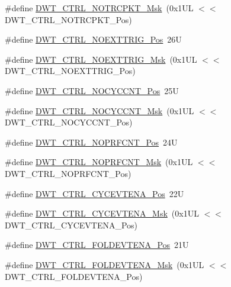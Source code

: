 \begin{DoxyCompactItemize}
\#define \hyperlink{group___c_m_s_i_s___d_w_t_ga04d8bb0a065ca38e2e5f13a97e1f7073}{D\+W\+T\+\_\+\+C\+T\+R\+L\+\_\+\+N\+O\+T\+R\+C\+P\+K\+T\+\_\+\+Msk}~(0x1\+U\+L $<$$<$ D\+W\+T\+\_\+\+C\+T\+R\+L\+\_\+\+N\+O\+T\+R\+C\+P\+K\+T\+\_\+\+Pos)
\item 
\#define \hyperlink{group___c_m_s_i_s___d_w_t_gad997b9026715d5609b5a3b144eca42d0}{D\+W\+T\+\_\+\+C\+T\+R\+L\+\_\+\+N\+O\+E\+X\+T\+T\+R\+I\+G\+\_\+\+Pos}~26U
\item 
\#define \hyperlink{group___c_m_s_i_s___d_w_t_gacc7d15edf7a27147c422099ab475953e}{D\+W\+T\+\_\+\+C\+T\+R\+L\+\_\+\+N\+O\+E\+X\+T\+T\+R\+I\+G\+\_\+\+Msk}~(0x1\+U\+L $<$$<$ D\+W\+T\+\_\+\+C\+T\+R\+L\+\_\+\+N\+O\+E\+X\+T\+T\+R\+I\+G\+\_\+\+Pos)
\item 
\#define \hyperlink{group___c_m_s_i_s___d_w_t_ga337f6167d960f57f12aa382ffecce522}{D\+W\+T\+\_\+\+C\+T\+R\+L\+\_\+\+N\+O\+C\+Y\+C\+C\+N\+T\+\_\+\+Pos}~25U
\item 
\#define \hyperlink{group___c_m_s_i_s___d_w_t_gaf40c8d7a4fd978034c137e90f714c143}{D\+W\+T\+\_\+\+C\+T\+R\+L\+\_\+\+N\+O\+C\+Y\+C\+C\+N\+T\+\_\+\+Msk}~(0x1\+U\+L $<$$<$ D\+W\+T\+\_\+\+C\+T\+R\+L\+\_\+\+N\+O\+C\+Y\+C\+C\+N\+T\+\_\+\+Pos)
\item 
\#define \hyperlink{group___c_m_s_i_s___d_w_t_gad52a0e5be84363ab166cc17beca0d048}{D\+W\+T\+\_\+\+C\+T\+R\+L\+\_\+\+N\+O\+P\+R\+F\+C\+N\+T\+\_\+\+Pos}~24U
\item 
\#define \hyperlink{group___c_m_s_i_s___d_w_t_gafd8448d7db4bc51f27f202e6e1f27823}{D\+W\+T\+\_\+\+C\+T\+R\+L\+\_\+\+N\+O\+P\+R\+F\+C\+N\+T\+\_\+\+Msk}~(0x1\+U\+L $<$$<$ D\+W\+T\+\_\+\+C\+T\+R\+L\+\_\+\+N\+O\+P\+R\+F\+C\+N\+T\+\_\+\+Pos)
\item 
\#define \hyperlink{group___c_m_s_i_s___d_w_t_ga0cb0640aaeb18a626d7823570d5c3cb6}{D\+W\+T\+\_\+\+C\+T\+R\+L\+\_\+\+C\+Y\+C\+E\+V\+T\+E\+N\+A\+\_\+\+Pos}~22U
\item 
\#define \hyperlink{group___c_m_s_i_s___d_w_t_ga40554bd81460e39abf08810f45fac1a2}{D\+W\+T\+\_\+\+C\+T\+R\+L\+\_\+\+C\+Y\+C\+E\+V\+T\+E\+N\+A\+\_\+\+Msk}~(0x1\+U\+L $<$$<$ D\+W\+T\+\_\+\+C\+T\+R\+L\+\_\+\+C\+Y\+C\+E\+V\+T\+E\+N\+A\+\_\+\+Pos)
\item 
\#define \hyperlink{group___c_m_s_i_s___d_w_t_ga5602b0707f446ce78d88ff2a3a82bfff}{D\+W\+T\+\_\+\+C\+T\+R\+L\+\_\+\+F\+O\+L\+D\+E\+V\+T\+E\+N\+A\+\_\+\+Pos}~21U
\item 
\#define \hyperlink{group___c_m_s_i_s___d_w_t_ga717e679d775562ae09185a3776b1582f}{D\+W\+T\+\_\+\+C\+T\+R\+L\+\_\+\+F\+O\+L\+D\+E\+V\+T\+E\+N\+A\+\_\+\+Msk}~(0x1\+U\+L $<$$<$ D\+W\+T\+\_\+\+C\+T\+R\+L\+\_\+\+F\+O\+L\+D\+E\+V\+T\+E\+N\+A\+\_\+\+Pos)

\end{DoxyCompactItemize}
